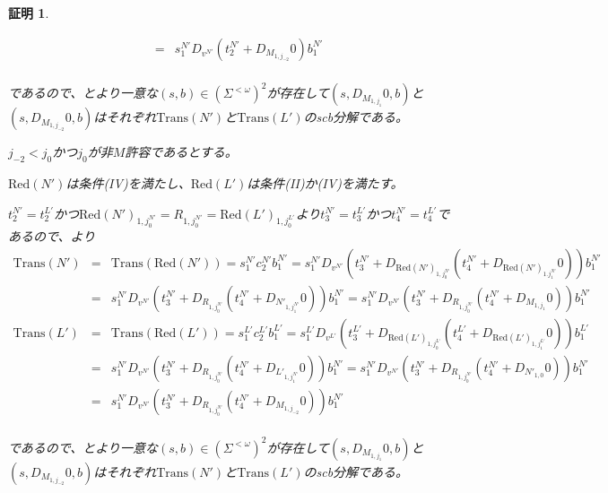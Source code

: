\documentclass[dvipdfmx,uplatex]{jsarticle}
\theoremstyle{customnonumberbreakfortheorem}
\theoremstyle{customnonumberbreakforproof}
\newtheorem{hideableproof}{証明}
\newcommand{\qedhere}{\hfill\hideableproofSymbol}
\begin{document}
\begin{hideableproof}
\begin{indented}
\begin{indented}
\begin{eqnarray*}
			& = & s_1^{N'} D_{v^{N'}}(t_2^{N'} + D_{M_{1,j_{-2}}} 0) b_1^{N'} \\
			\end{eqnarray*}
			\item であるので、とより一意な\((s,b) \in (\Sigma^{< \omega})^2\)が存在して\((s,D_{M_{1,j_1}} 0,b)\)と\((s,D_{M_{1,j_{-2}}} 0,b)\)はそれぞれ\(\textrm{Trans}(N')\)と\(\textrm{Trans}(L')\)のscb分解である。\qedhere
		\end{indented}
		\item
		\item \(j_{-2} < j_0\)かつ\(j_0\)が非\(M\)許容であるとする。
		\begin{indented}
			\item \(\textrm{Red}(N')\)は条件(IV)を満たし、\(\textrm{Red}(L')\)は条件(II)か(IV)を満たす。
			\item \(t_2^{N'} = t_2^{L'}\)かつ\(\textrm{Red}(N')_{1,j_0^{N'}} = R_{1,j_0^{N'}} = \textrm{Red}(L')_{1,j_0^{L'}}\)より\(t_3^{N'} = t_3^{L'}\)かつ\(t_4^{N'} = t_4^{L'}\)であるので、より
			\begin{eqnarray*}
			\textrm{Trans}(N') & = & \textrm{Trans}(\textrm{Red}(N')) = s_1^{N'} c_2^{N'} b_1^{N'} = s_1^{N'} D_{v^{N'}}(t_3^{N'} + D_{\textrm{Red}(N')_{1,j_0^{N'}}}(t_4^{N'} + D_{\textrm{Red}(N')_{1.j_1^{N'}}} 0)) b_1^{N'} \\
			& = & s_1^{N'} D_{v^{N'}}(t_3^{N'} + D_{R_{1,j_0^{N'}}}(t_4^{N'} + D_{N'_{1,j_1^{N'}}} 0)) b_1^{N'} = s_1^{N'} D_{v^{N'}}(t_3^{N'} + D_{R_{1,j_0^{N'}}}(t_4^{N'} + D_{M_{1,j_1}} 0)) b_1^{N'} \\
			\textrm{Trans}(L') & = & \textrm{Trans}(\textrm{Red}(L')) = s_1^{L'} c_2^{L'} b_1^{L'} = s_1^{L'} D_{v^{L'}}(t_3^{L'} + D_{\textrm{Red}(L')_{1,j_0^{L'}}}(t_4^{L'} + D_{\textrm{Red}(L')_{1,j_1^{L'}}} 0)) b_1^{L'} \\
			& = & s_1^{N'} D_{v^{N'}}(t_3^{N'} + D_{R_{1,j_0^{N'}}}(t_4^{N'} + D_{L'_{1,j_1^{N'}}} 0)) b_1^{N'} = s_1^{N'} D_{v^{N'}}(t_3^{N'} + D_{R_{1,j_0^{N'}}}(t_4^{N'} + D_{N'_{1,0}} 0)) b_1^{N'} \\
			& = & s_1^{N'} D_{v^{N'}}(t_3^{N'} + D_{R_{1,j_0^{N'}}}(t_4^{N'} + D_{M_{1,j_{-2}}} 0)) b_1^{N'} \\
			\end{eqnarray*}
			\item であるので、とより一意な\((s,b) \in (\Sigma^{< \omega})^2\)が存在して\((s,D_{M_{1,j_1}} 0,b)\)と\((s,D_{M_{1,j_{-2}}} 0,b)\)はそれぞれ\(\textrm{Trans}(N')\)と\(\textrm{Trans}(L')\)のscb分解である。
		\end{indented}
	\end{indented}
\end{hideableproof}
\end{document}
